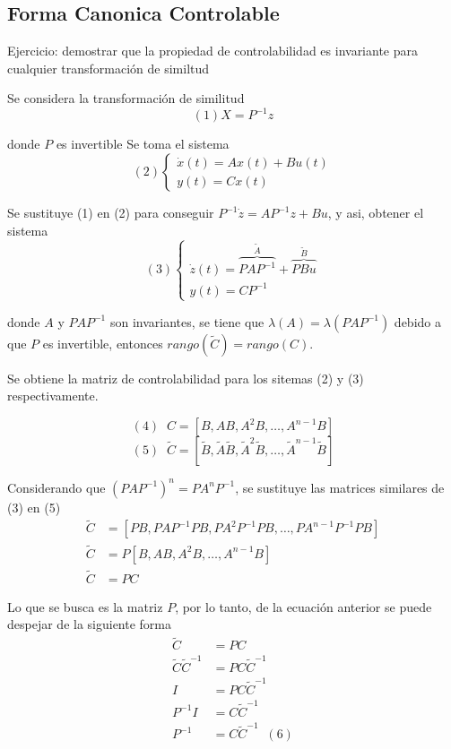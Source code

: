 \subsection{Forma Canonica Controlable}
Ejercicio: demostrar que la propiedad de controlabilidad es invariante para cualquier transformación de similtud

Se considera la transformación de similitud
\[
    (1) X=P^{-1}z
\]

donde \( P \) es invertible
Se toma el sistema 
\[
    (2)
    \left\{
        \begin{array}{lll}
            \dot{x}(t) = Ax(t) + Bu(t)\\
            y(t) = Cx(t)
        \end{array}
    \right.
\]

Se sustituye (1) en (2) para conseguir \( P^{-1}\dot{z} = AP^{-1}z+Bu \), y asi, obtener el sistema
\[
    (3)
    \left\{
        \begin{array}{lll}
            \dot{z}(t) =
                \overbrace{PAP^{-1}}^{\tilde{A}}+ 
                \overbrace{PBu}^{\tilde{B}}\\
            y(t) = CP^{-1}
        \end{array}
    \right.
\]

donde \( A \) y \( PAP^{-1} \) son invariantes, se tiene que \( \lambda (A) = \lambda(PAP^{-1}) \) debido a que \( P \) es invertible, entonces \(rango(\tilde{C}) = rango(C)\).

Se obtiene la matriz de controlabilidad para los sitemas (2) y (3) respectivamente.

\[
    (4)\;\;
    C=[B , AB , A^{2}B , \ldots , A^{n-1}B]
\]
\[
    (5)\;\;
    \tilde{C}=[\tilde{B} , \tilde{A}\tilde{B} , \tilde{A}^{2}\tilde{B} , \ldots , \tilde{A}^{n-1}\tilde{B}]
\]

Considerando que \( (PAP^{-1})^{n} = PA^{n}P^{-1} \), se sustituye las matrices similares de (3) en (5)
\[
    \begin{split}
        \tilde{C} & = [PB, PAP^{-1}PB, PA^{2}P^{-1}PB, \ldots, PA^{n-1}P^{-1}PB] \\
        \tilde{C} & = P[B, AB, A^{2}B, \ldots, A^{n-1}B] \\
        \tilde{C} & = PC 
    \end{split}
\]

Lo que se busca es la matriz \( P \), por lo tanto, de la ecuación anterior se puede despejar de la siguiente forma
\[
    \begin{split}
        \tilde{C} & = PC \\
        \tilde{C}\tilde{C}^{-1} & = PC\tilde{C}^{-1} \\
        I & = PC\tilde{C}^{-1} \\
        P^{-1}I & = C\tilde{C}^{-1} \\
        P^{-1} & = C\tilde{C}^{-1}\;\;(6)
    \end{split}
\]

